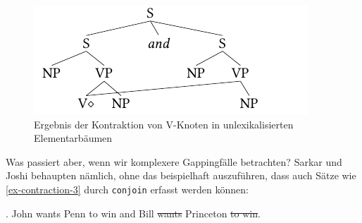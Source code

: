 \begin{figure}[t]
\centering
\includegraphics{graphics/abb88.pdf}
\caption{\label{fig-contraction-3}Ergebnis der Kontraktion von V-Knoten in unlexikalisierten Elementar\-bäumen}
\end{figure}

Was passiert aber, wenn wir komplexere Gappingfälle betrachten? Sarkar und Joshi behaupten nämlich, ohne das beispielhaft auszuführen, dass auch Sätze wie \ref{ex-contraction-3} durch {\tt conjoin} erfasst werden können:

\ex. \label{ex-contraction-3}John wants Penn to win and Bill \sout{wants} Princeton \sout{to win}. 


